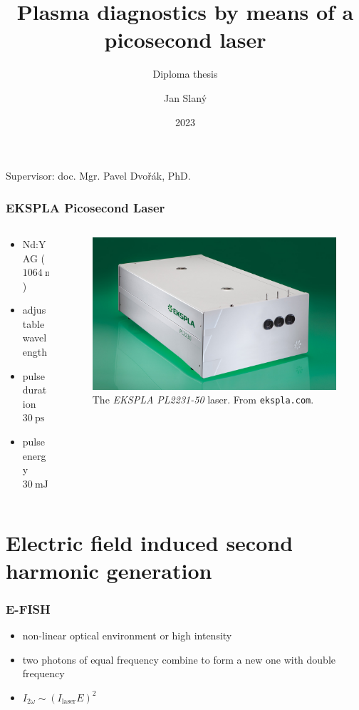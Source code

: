 \documentclass{beamer}
\title[Laser plasma diagnostics]
{Plasma diagnostics by means of a picosecond laser}
\subtitle{Diploma thesis}
\date{2023}
\author{Jan Slaný}
\institute[PřF MUNI]{Faculty of Science, Masaryk University\\
	Department of Physical Electronics}
\newcommand\elfield{E}
\newcommand\efish{I_{2\omega}}
\begin{document}
\begin{frame}[plain]
	\titlepage
	\footnotesize
	Supervisor: doc. Mgr. Pavel Dvořák, PhD.
\end{frame}

\begin{frame}
	\frametitle{EKSPLA Picosecond Laser}
	\begin{columns}
	\begin{column}{0.5\textwidth}
		\begin{itemize}
			\item Nd:YAG ($\SI{1064}{\nano\metre}$)
			\item adjustable wavelength
			\item pulse duration $\SI{30}{\pico\second}$
			\item pulse energy $\SI{30}{\milli\joule}$
		\end{itemize}
	\end{column}
	\begin{column}{0.5\textwidth}
		\begin{figure}
			\centering
			\includegraphics[width=\textwidth]{laser}
			\caption{The \emph{EKSPLA PL2231-50} laser.
				From \texttt{ekspla.com}.}
		\end{figure}
	\end{column}
	\end{columns}
\end{frame}

\section[E-FISH]{Electric field induced second harmonic generation}

\begin{frame}
	\frametitle{E-FISH}
	\begin{itemize}
		\item non-linear optical environment or high intensity
		\item two photons of equal frequency combine to form
			a new one with double frequency
		\item $\efish \sim (I_\mathrm{laser} \elfield)^2$
	\end{itemize}
\end{frame}
\end{document}
